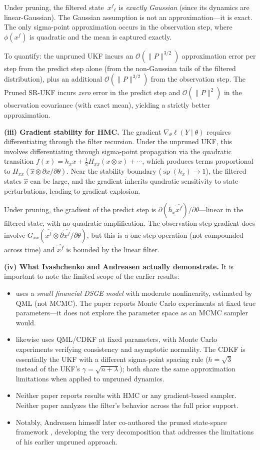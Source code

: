 \documentclass[12pt,a4paper]{article}
\newcommand{\kron}{\otimes}
\newcommand{\xf}{{x^{f}}}
\newcommand{\hx}{h_x}
\newcommand{\Gxx}{G_{xx}}
\newcommand{\Hxx}{H_{xx}}
\newcommand{\cO}{\mathcal{O}}
\DeclareMathOperator{\specrad}{sp}
\begin{document}
Under pruning, the filtered state~$\xf_t$ is \emph{exactly
Gaussian} (since its dynamics are linear-Gaussian). The Gaussian
assumption is not an approximation---it is exact. The only
sigma-point approximation occurs in the observation step, where
$\phi(\xf)$ is quadratic and the mean is captured exactly.

To quantify: the unpruned UKF incurs an $\cO(\|P\|^{3/2})$
approximation error per step from the predict step alone (from the
non-Gaussian tails of the filtered distribution), plus an additional
$\cO(\|P\|^{3/2})$ from the observation step. The Pruned SR-UKF
incurs \emph{zero} error in the predict step and
$\cO(\|P\|^2)$ in the observation covariance (with exact mean),
yielding a strictly better approximation.

\medskip\noindent\textbf{(iii) Gradient stability for HMC.}
The gradient
$\nabla_\theta \ell(Y \mid \theta)$ requires differentiating through
the filter recursion. Under the unpruned UKF, this involves
differentiating through sigma-point propagation via the quadratic
transition $f(x) = \hx x + \tfrac{1}{2}\Hxx(x \kron x) + \cdots$,
which produces terms proportional to
$\Hxx(\hat{x} \kron \partial\hat{x}/\partial\theta)$. Near the
stability boundary ($\specrad(\hx) \to 1$), the filtered states
$\hat{x}$ can be large, and the gradient inherits quadratic
sensitivity to state perturbations, leading to gradient explosion.

Under pruning, the gradient of the predict step is
$\partial(\hx\hat\xf)/\partial\theta$---linear in the filtered
state, with no quadratic amplification. The observation-step gradient
does involve $\Gxx(\hat\xf \kron \partial\hat\xf/\partial\theta)$,
but this is a one-step operation (not compounded across time) and
$\hat\xf$ is bounded by the linear filter.

\medskip\noindent\textbf{(iv) What Ivashchenko and Andreasen
actually demonstrate.}
It is important to note the limited scope of the earlier results:
\begin{itemize}[nosep]
\item \citet{ivashchenko2014dsge} uses a \emph{small financial DSGE
model} with moderate nonlinearity, estimated by QML (not MCMC). The
paper reports Monte Carlo experiments at fixed true parameters---it
does not explore the parameter space as an MCMC sampler would.
\item \citet{andreasen2012non} likewise uses QML/CDKF at fixed
parameters, with Monte Carlo experiments verifying consistency and
asymptotic normality. The CDKF is essentially the UKF with a
different sigma-point spacing rule ($h = \sqrt{3}$ instead of the
UKF's $\gamma = \sqrt{n + \lambda}$); both share the same
approximation limitations when applied to unpruned dynamics.
\item Neither paper reports results with HMC or any gradient-based
sampler. Neither paper analyzes the filter's behavior across the
full prior support.
\item Notably, Andreasen himself later co-authored the pruned
state-space framework \citep{andreasen2018pruned}, developing the
very decomposition that addresses the limitations of his earlier
unpruned approach.
\end{itemize}
\end{document}

